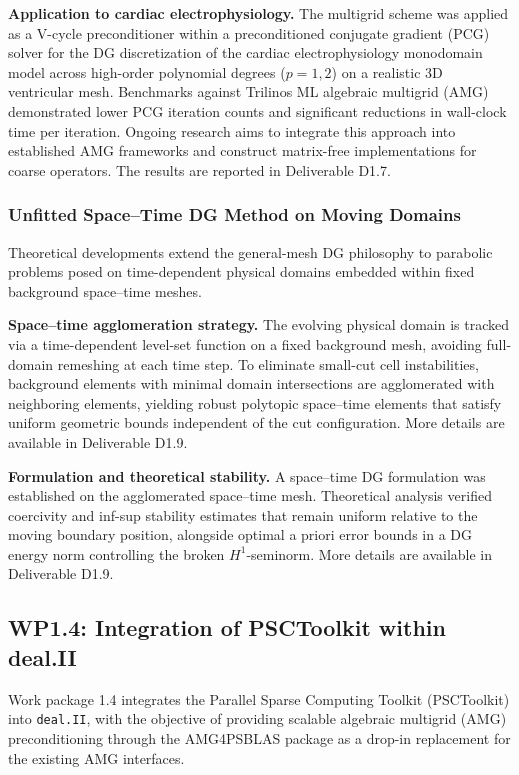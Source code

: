 \documentclass[a4paper,12pt, numbers]{article}
\newcommand{\dealii}{\texttt{deal.II}}
\begin{document}
\noindent\textbf{Application to cardiac electrophysiology.}
The multigrid scheme was applied as a V-cycle preconditioner within a preconditioned conjugate gradient (PCG) solver for the DG discretization of the cardiac electrophysiology monodomain model across high-order polynomial degrees ($p=1, 2$) on a realistic 3D ventricular mesh. Benchmarks against Trilinos ML algebraic multigrid (AMG) demonstrated lower PCG iteration counts and significant reductions in wall-clock time per iteration. Ongoing research aims to integrate this approach into established AMG frameworks and construct matrix-free implementations for coarse operators. The results are reported in Deliverable D1.7.

\subsubsection*{Unfitted Space--Time DG Method on Moving Domains}

\noindent Theoretical developments extend the general-mesh DG philosophy to parabolic problems posed on time-dependent physical domains embedded within fixed background space--time meshes.

\noindent\textbf{Space--time agglomeration strategy.}
The evolving physical domain is tracked via a time-dependent level-set function on a fixed background mesh, avoiding full-domain remeshing at each time step. To eliminate small-cut cell instabilities, background elements with minimal domain intersections are agglomerated with neighboring elements, yielding robust polytopic space--time elements that satisfy uniform geometric bounds independent of the cut configuration. More details are available in Deliverable D1.9.

\noindent\textbf{Formulation and theoretical stability.}
A space--time DG formulation was established on the agglomerated space--time mesh. Theoretical analysis verified coercivity and inf-sup stability estimates that remain uniform relative to the moving boundary position, alongside optimal a priori error bounds in a DG energy norm controlling the broken $H^1$-seminorm. More details are available in Deliverable D1.9.

\subsection{WP1.4: Integration of PSCToolkit within deal.II} \label{sec:wp1_psctoolkit}%

Work package 1.4 integrates the Parallel Sparse Computing Toolkit (PSCToolkit) into \dealii{}, with the objective of providing scalable algebraic multigrid (AMG) preconditioning through the AMG4PSBLAS package as a drop-in replacement for the existing AMG interfaces.
\end{document}
